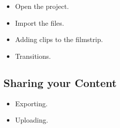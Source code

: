\documentclass[letterpaper]{latexclasses/tmarticle}
\begin{document}
\begin{itemize}
    \item
    Open the project.
    
    \item
    Import the files.
    
    \item
    Adding clips to the filmstrip.
    
    
    
    \item
    Transitions.
    
    
    

\end{itemize}

\subsection{Sharing your Content}

\begin{itemize}
    \item
    Exporting.
    
    
    \item
    Uploading.
    

\end{itemize}
\end{document}
